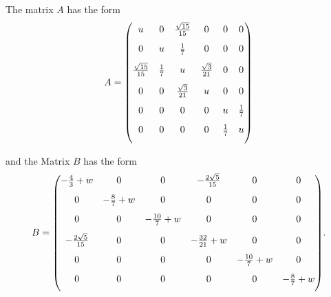 \begin{frame}
	\scriptsize
The matrix $A$ has the form \\
\vspace{8pt}
\[
{
	A= \begin{pmatrix}
		\vspace{8pt}
		u & 0 & \frac{\sqrt{15}}{15} & 0 & 0 & 0 \\
		\vspace{8pt}
		0 & u & \frac{1}{7} & 0 & 0 & 0 \\
		\vspace{8pt}
		\frac{\sqrt{15}}{15} & \frac{1}{7} & u & \frac{\sqrt{3}}{21} & 0 &  0 \\
		\vspace{8pt}
		0 & 0 & \frac{\sqrt{3}}{21} & u & 0 & 0 \\
		\vspace{8pt}
		0 & 0 & 0 & 0 & u & \frac{1}{7}\\
		\vspace{8pt}
		0 & 0 & 0 & 0 & \frac{1}{7} & u
	\end{pmatrix}
}
\]
\end{frame}

\begin{frame}
	\scriptsize
	and the Matrix $B$ has the form
\[
{
		B= \begin{pmatrix}
		\vspace{8pt}
		-\frac{4}{3}+w & 0 & 0 & -\frac{2\sqrt{5}}{15} & 0 & 0 \\
		\vspace{8pt}
		0 & -\frac{8}{7}+w & 0 & 0 &0 & 0 \\
		\vspace{8pt}
		0 & 0 & -\frac{10}{7}+w & 0 & 0 & 0 \\
		\vspace{8pt}
		-\frac{2\sqrt{5}}{15} & 0 & 0 & -\frac{32}{21}+w & 0 & 0 \\
		\vspace{8pt}
		0 & 0 & 0 & 0 & -\frac{10}{7}+w & 0\\
		\vspace{8pt}
		0 & 0 & 0 & 0 & 0 & -\frac{8}{7}+w
	\end{pmatrix}
}.
\]
\end{frame}
